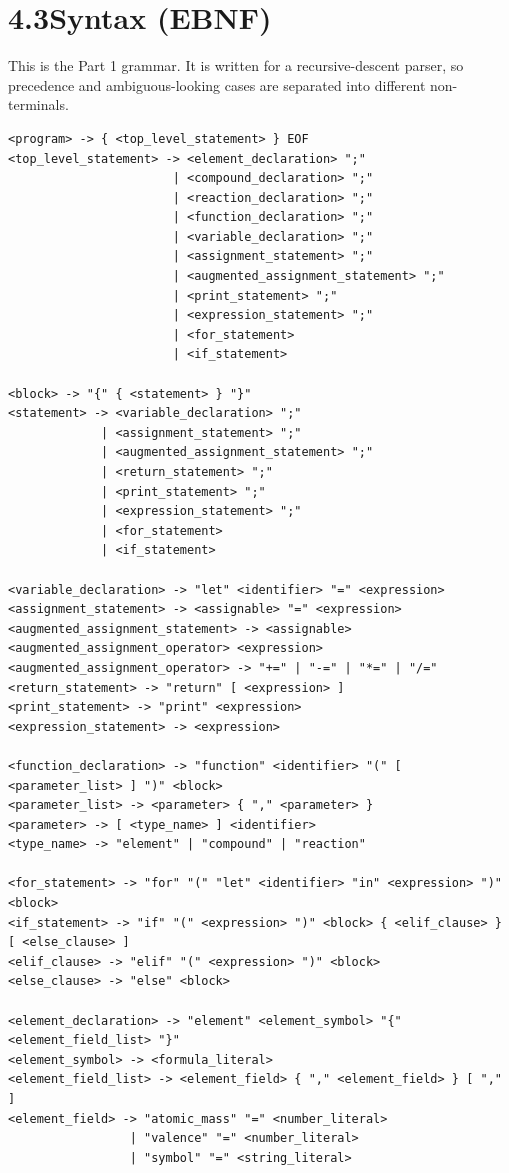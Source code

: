 \documentclass[11pt,a4paper]{article}
\begin{document}
\section{4.3\quad Syntax (EBNF)}

This is the Part 1 grammar. It is written for a recursive-descent parser, so precedence and
ambiguous-looking cases are separated into different non-terminals.

\begin{lstlisting}[style=ebnf]
<program> -> { <top_level_statement> } EOF
<top_level_statement> -> <element_declaration> ";"
                       | <compound_declaration> ";"
                       | <reaction_declaration> ";"
                       | <function_declaration> ";"
                       | <variable_declaration> ";"
                       | <assignment_statement> ";"
                       | <augmented_assignment_statement> ";"
                       | <print_statement> ";"
                       | <expression_statement> ";"
                       | <for_statement>
                       | <if_statement>

<block> -> "{" { <statement> } "}"
<statement> -> <variable_declaration> ";"
             | <assignment_statement> ";"
             | <augmented_assignment_statement> ";"
             | <return_statement> ";"
             | <print_statement> ";"
             | <expression_statement> ";"
             | <for_statement>
             | <if_statement>

<variable_declaration> -> "let" <identifier> "=" <expression>
<assignment_statement> -> <assignable> "=" <expression>
<augmented_assignment_statement> -> <assignable> <augmented_assignment_operator> <expression>
<augmented_assignment_operator> -> "+=" | "-=" | "*=" | "/="
<return_statement> -> "return" [ <expression> ]
<print_statement> -> "print" <expression>
<expression_statement> -> <expression>

<function_declaration> -> "function" <identifier> "(" [ <parameter_list> ] ")" <block>
<parameter_list> -> <parameter> { "," <parameter> }
<parameter> -> [ <type_name> ] <identifier>
<type_name> -> "element" | "compound" | "reaction"

<for_statement> -> "for" "(" "let" <identifier> "in" <expression> ")" <block>
<if_statement> -> "if" "(" <expression> ")" <block> { <elif_clause> } [ <else_clause> ]
<elif_clause> -> "elif" "(" <expression> ")" <block>
<else_clause> -> "else" <block>

<element_declaration> -> "element" <element_symbol> "{" <element_field_list> "}"
<element_symbol> -> <formula_literal>
<element_field_list> -> <element_field> { "," <element_field> } [ "," ]
<element_field> -> "atomic_mass" "=" <number_literal>
                 | "valence" "=" <number_literal>
                 | "symbol" "=" <string_literal>


\end{lstlisting}
\end{document}
